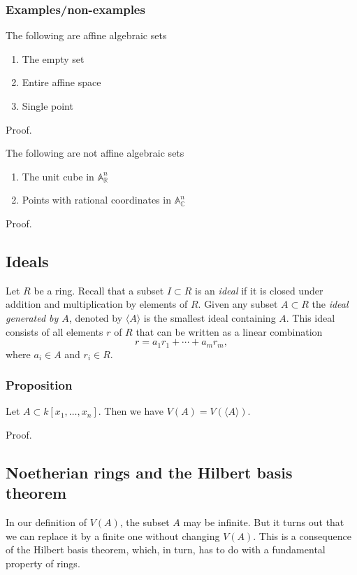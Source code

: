 \documentclass[11pt]{article}
\begin{document}
\subsubsection{Examples/non-examples}
\label{sec:orgb82399e}
The following are affine algebraic sets
\begin{enumerate}
\item The empty set
\item Entire affine space
\item Single point
\end{enumerate}
\begin{skipped}
Proof.
\end{skipped}

The following are not affine algebraic sets
\begin{enumerate}
\item The unit cube in \(\mathbb A^n_{{\mathbb R}}\)
\item Points with rational coordinates in \(\mathbb A^n_{{\mathbb C}}\)
\end{enumerate}
\begin{skipped}
Proof.
\end{skipped}

\subsection{Ideals}
\label{sec:org518e25b}
Let \(R\) be a ring.
Recall that a subset \(I \subset R\) is an \emph{ideal} if it is closed under addition and multiplication by elements of \(R\).
Given any subset \(A \subset R\) the \emph{ideal generated by \(A\)}, denoted by \(\langle A \rangle\) is the smallest ideal containing \(A\).
This ideal consists of all elements \(r\) of  \(R\) that can be written as a linear combination
\[ r = a_1 r_1 + \cdots + a_m r_m,\]
where \(a_i \in A\) and \(r_i \in R\).

\subsubsection{Proposition}
\label{sec:org4ae0982}
Let \(A \subset k[x_1,\dots,x_n]\). Then we have \(V(A) = V(\langle A \rangle)\).
\begin{skipped}
Proof.
\end{skipped}

\subsection{Noetherian rings and the Hilbert basis theorem}
\label{sec:orgfeaf377}
In our definition of \(V(A)\), the subset \(A\) may be infinite. 
But it turns out that we can replace it by a finite one without changing \(V(A)\).
This is a consequence of the Hilbert basis theorem, which, in turn, has to do with a fundamental property of rings.
\end{document}
